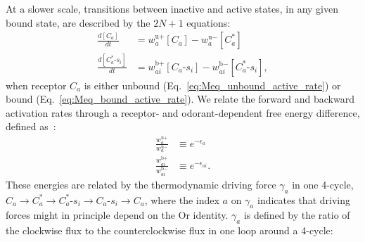 \documentclass[9pt,twoside]{pnas-new}
\begin{document}
At a slower scale, transitions between inactive and active states, in any given bound state, are described by the $2N + 1$ equations:
\begin{align}
\frac{d[C_a]}{dt} &= w^{\text{u}+}_a [C_a] - w^{\text{u}-}_a [C^*_a] \label{eq:Meq_unbound_active_rate}\\
\frac{d[C^*_a\text{-}s_i]}{dt} &=  w^{\text{b}+}_{ai} [C_a\text{-}s_i] - w^{\text{b}-}_{ai}  [C^*_a\text{-}s_i],
\label{eq:Meq_bound_active_rate}
\end{align}
when receptor $C_a$ is either unbound (Eq.~\ref{eq:Meq_unbound_active_rate}) or bound (Eq.~\ref{eq:Meq_bound_active_rate}). We relate the forward and backward activation rates through a receptor- and odorant-dependent free energy difference, defined as~\cite{srinivas_elife}:
\begin{align}
\frac{w^{\text{u}+}_a}{w^{\text{u}-}_a} &\equiv e^{-\epsilon_a} \label{eq:epsilon_unbound} \\
\frac{w^{\text{b}+}_{ai}}{w^{\text{b}-}_{ai}} &\equiv e^{-\epsilon_{ai}}.\label{eq:epsilon_bound}
\end{align}
These energies are related by the thermodynamic driving force  $\gamma_a$ in one 4-cycle, $C_a \rightarrow C_a^* \rightarrow C_a^*\text{-}s_i \rightarrow C_a\text{-}s_i \rightarrow C_a$, 
where the index $a$ on $\gamma_a$ indicates that driving forces might in principle depend on the Or identity. $\gamma_a$ is defined by the ratio of the clockwise flux to the counterclockwise flux in one loop around a 4-cycle:
\end{document}
